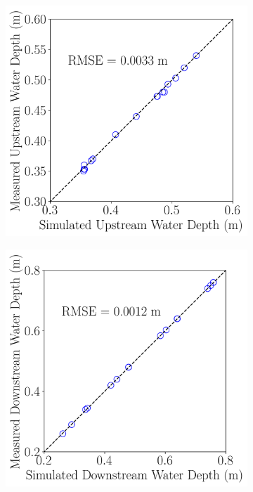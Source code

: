 \documentclass[preview, border=2pt]{standalone}
\begin{document}
\begin{figure}
     \centering
     \begin{subfigure}[b]{0.32\textwidth}
         \centering
         \caption{}
         \includegraphics[width=\textwidth]{calibration_results_ManningN_upstream_water_depth.png}
     \end{subfigure}
     \hfill     
     \begin{subfigure}[b]{0.32\textwidth}
         \centering
         \caption{}
         \includegraphics[width=\textwidth]{calibration_results_ManningN_downstream_water_depth.png}

\end{subfigure}
\end{figure}
\end{document}
